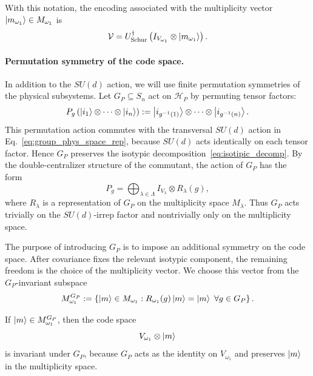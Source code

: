 \documentclass[10pt,twocolumn,superscriptaddress,aps,amsmath,amssymb,citeautoscript,floatfix,prx]{revtex4-2}
\theoremstyle{plain}
\theoremstyle{plain}
\theoremstyle{plain}
\theoremstyle{plain}
\theoremstyle{plain}
\theoremstyle{plain}
\theoremstyle{plain}
\theoremstyle{definition}
\theoremstyle{plain}
\begin{document}
With this notation, the encoding associated with the multiplicity vector $\ket{m_{\omega_1}}\in M_{\omega_1}$ is
\begin{equation}\label{eq:schur_transform_enc}
\mathcal{V}
=
U_{\mathrm{Schur}}^\dagger
\left(
I_{V_{\omega_1}}
\otimes
\ket{m_{\omega_1}}
\right).
\end{equation}

\paragraph{Permutation symmetry of the code space.}

In addition to the $SU(d)$ action, we will use finite permutation symmetries of the physical subsystems. Let $G_P\subseteq S_n$ 
act on $\mathcal H_P$ by permuting tensor factors:
\begin{equation}\label{eq:group_act_on_phys_space}
P_g
\left(
\ket{i_1}\otimes\cdots\otimes\ket{i_n}
\right)
:=
\ket{i_{g^{-1}(1)}}\otimes\cdots\otimes\ket{i_{g^{-1}(n)}} .
\end{equation}
This permutation action commutes with the transversal $SU(d)$ action in Eq.~\eqref{eq:group_phys_space_rep}, 
because $SU(d)$ acts identically on each tensor factor. Hence $G_P$ preserves the isotypic decomposition~\eqref{eq:isotipic_decomp}. 
By the double-centralizer structure of the commutant, the action of $G_P$ has the form~\cite{GoodmanWallach2009}
\begin{equation}\label{eq:group_act_on_code}
P_g
=
\bigoplus_{\lambda\in\Lambda}
I_{V_\lambda}\otimes R_\lambda(g),
\end{equation}
where $R_\lambda$ is a representation of $G_P$ on the multiplicity space $M_\lambda$. Thus $G_P$ acts trivially on the 
$SU(d)$-irrep factor and nontrivially only on the multiplicity space.

The purpose of introducing $G_P$ is to impose an additional symmetry on the code space. After covariance fixes the relevant isotypic component,
the remaining freedom is the choice of the multiplicity vector. We choose this vector from the $G_P$-invariant subspace
\begin{equation}\label{eq:g_inv_subspace}
M_{\omega_1}^{G_P}
:=
\left\{
\ket m\in M_{\omega_1}
:
R_{\omega_1}(g)\ket m=\ket m
\ \forall g\in G_P
\right\}.
\end{equation}

If $\ket m\in M_{\omega_1}^{G_P}$, then the code space
$$
V_{\omega_1}\otimes\ket m
$$
is invariant under $G_P$, because $G_P$ acts as the identity on $V_{\omega_1}$ and preserves $\ket m$ in the multiplicity space.
\end{document}

